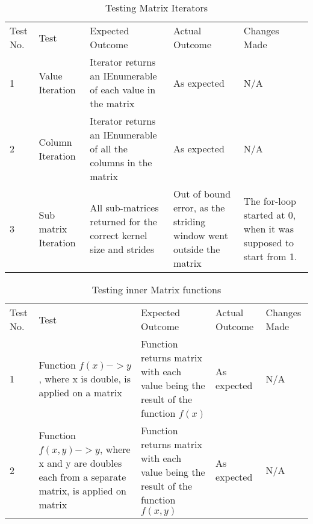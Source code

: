 \begin{table}[H]
\centering
    \begin{tabular}{|p{1cm}|p{4cm}|p{4cm}|p{3cm}|p{2cm}|}
        \hline
        Test No. & Test & Expected Outcome & Actual Outcome & Changes Made \\ \cline{1-5} 
        1 & Value Iteration & Iterator returns an IEnumerable of each value in the matrix & As expected & N/A \\
        \cline{1-5}
        2 & Column Iteration & Iterator returns an IEnumerable of all the columns in the matrix & As expected & N/A \\
        \cline{1-5}
        3 & Sub matrix Iteration & All sub-matrices returned for the correct kernel size and strides & Out of bound error, as the striding window went outside the matrix & The for-loop started at 0, when it was supposed to start from 1.\\
        \cline{1-5}
    \end{tabular}
    \caption{Testing Matrix Iterators}
    \vspace{0.5cm}
\end{table}

\begin{table}[H]
\centering
    \begin{tabular}{|p{1cm}|p{4cm}|p{4cm}|p{3cm}|p{2cm}|}
        \hline
        Test No. & Test & Expected Outcome & Actual Outcome & Changes Made \\ \cline{1-5} 
        1 & Function $f(x) -> y$, where x is double, is applied on a matrix & Function returns matrix with each value being the result of the function $f(x)$ & As expected & N/A \\
        \cline{1-5}
        2 & Function $f(x,y) -> y$, where x and y are doubles each from a separate matrix, is applied on matrix & Function returns matrix with each value being the result of the function $f(x,y)$ & As expected & N/A \\
        \cline{1-5}        
    \end{tabular}
    \caption{Testing inner Matrix functions}
    \vspace{0.5cm}
\end{table}




